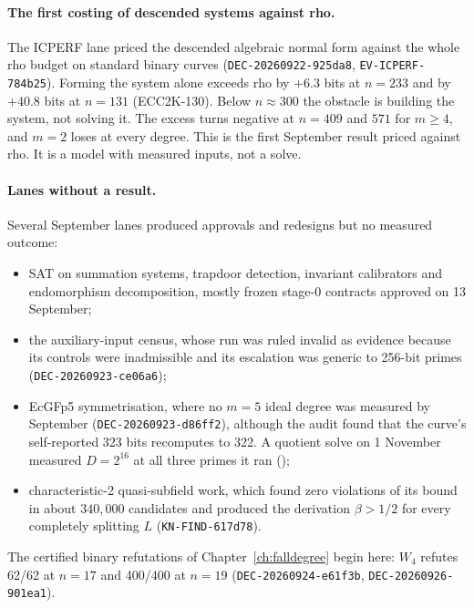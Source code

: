 \paragraph{The first costing of descended systems against rho.} The ICPERF
lane priced the descended algebraic normal form against the whole rho
budget on standard binary curves (\texttt{DEC-20260922-925da8},
\texttt{EV-ICPERF-784b25}). Forming the system alone exceeds rho by
$+6.3$ bits at $n=233$ and by $+40.8$ bits at $n=131$ (ECC2K-130).
Below $n\approx300$ the obstacle is building the system, not solving it.
The excess turns negative at $n=409$ and $571$ for $m\ge4$, and $m=2$
loses at every degree. This is the first September result priced against
rho. It is a model with measured inputs, not a solve.

\paragraph{Lanes without a result.} Several September lanes produced
approvals and redesigns but no measured outcome:
\begin{itemize}
\item SAT on summation systems, trapdoor detection, invariant calibrators
  and endomorphism decomposition, mostly frozen stage-0 contracts
  approved on 13 September;
\item the auxiliary-input census, whose run was ruled invalid as evidence
  because its controls were inadmissible and its escalation was generic to
  256-bit primes (\texttt{DEC-20260923-ce06a6});
\item EcGFp5 symmetrisation, where no $m=5$ ideal degree was measured by
  September (\texttt{DEC-20260923-d86ff2}), although the audit found that the
  curve's self-reported 323 bits recomputes to 322. A quotient solve on 1
  November measured $D=2^{16}$ at all three primes it ran
  ();
\item characteristic-2 quasi-subfield work, which found zero violations of
  its bound in about $340{,}000$ candidates and produced the derivation
  $\beta>1/2$ for every completely splitting $L$ (\texttt{KN-FIND-617d78}).
\end{itemize}
The certified binary refutations of Chapter~\ref{ch:falldegree} begin here:
$W_4$ refutes 62/62 at $n=17$ and 400/400 at $n=19$
(\texttt{DEC-20260924-e61f3b}, \texttt{DEC-20260926-901ea1}).

